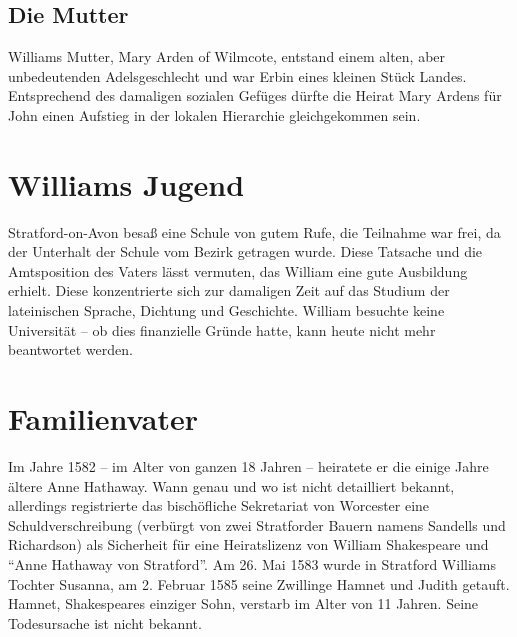 \subsection{Die Mutter}
Williams Mutter, Mary Arden of Wilmcote, entstand einem
alten, aber unbedeutenden Adelsgeschlecht und war Erbin eines kleinen Stück
Landes. Entsprechend des damaligen sozialen Gefüges dürfte die Heirat Mary
Ardens für John einen Aufstieg in der lokalen Hierarchie gleichgekommen sein.

\section{Williams Jugend}

Stratford-on-Avon besaß eine Schule von gutem Rufe, die Teilnahme war frei, da
der Unterhalt der Schule vom Bezirk getragen wurde. Diese Tatsache und die
Amtsposition des Vaters lässt vermuten, das William eine gute Ausbildung
erhielt. Diese konzentrierte sich zur damaligen Zeit auf das Studium der
lateinischen Sprache, Dichtung und Geschichte. William besuchte keine
Universität -- ob dies finanzielle Gründe hatte, kann heute nicht mehr
beantwortet werden.

\section{Familienvater}

Im Jahre 1582 -- im Alter von ganzen 18 Jahren -- heiratete er die einige Jahre
ältere Anne Hathaway. Wann genau und wo ist nicht detailliert bekannt,
allerdings registrierte das bischöfliche Sekretariat von Worcester eine
Schuldverschreibung (verbürgt von zwei Stratforder Bauern namens Sandells und
Richardson) als Sicherheit für eine Heiratslizenz von William Shakespeare und
"`Anne Hathaway von Stratford"'. Am 26. Mai 1583 wurde in Stratford Williams
Tochter Susanna, am 2. Februar 1585 seine Zwillinge Hamnet und Judith getauft.
Hamnet, Shakespeares einziger Sohn, verstarb im Alter von 11 Jahren. Seine
Todesursache ist nicht bekannt.
